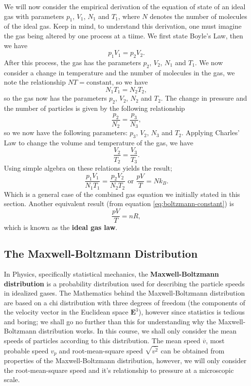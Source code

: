 We will now consider the empirical derivation of the equation of state of an ideal gas with parameters $p_1$, $V_1$, $N_1$ and $T_1$, where $N$ denotes the number of molecules of the ideal gas. Keep in mind, to understand this derivation, one must imagine the gas being altered by one process at a tiime. We first state Boyle's Law, then we have 
\begin{equation*}
    p_1 V_1 = p_2 V_2.    
\end{equation*}
After this process, the gas has the parameters $p_2$, $V_2$, $N_1$ and $T_1$. We now consider a change in temperature and the number of molecules in the gas, we note the relationship $NT = \text{constant}$, so we have 
\begin{equation*}
    N_1 T_1 = N_2 T_2,
\end{equation*} 
so the gas now has the parameters $p_2$, $V_2$, $N_2$ and $T_2$. The change in pressure and the number of particles is given by the following relationship 
\begin{equation*}
    \frac{p_2}{N_2} = \frac{p_3}{N_3},
\end{equation*} 
so we now have the following parameters: $p_3$, $V_2$, $N_3$ and $T_2$. Applying Charles' Law to change the volume and temperature of the gas, we have
\begin{equation*}
    \frac{V_2}{T_2} = \frac{V_3}{T_3}.
\end{equation*}
Using simple algebra on these relations yields the result;
\begin{equation*}
    \frac{p_1 V_1}{N_1 T_1} = \frac{p_2 V_2}{N_2 T_2} \text{ or } \frac{pV}{T} = N k_B.
\end{equation*}
Which is a general case of the combined gas equation we initially stated in this section. Another equivalent result (from equation \ref{eq:boltzmann-constant}) is 
\begin{equation*}
    \frac{pV}{T} = nR,
\end{equation*}
which is known as the \textbf{ideal gas law}.

\subsection{The Maxwell-Boltzmann Distribution}

In Physics, specifically statistical mechanics, the \textbf{Maxwell-Boltzmann distribution} is a probability distribution used for describing the particle speeds in idealized gases. The Mathematics behind the Maxwell-Boltzmann distribution are based on a chi distribution with three degrees of freedom (the components of the velocity vector in the Euclidean space $\mathbf{E}^3$), however since statistics is tedious and boring; we shall go no further than this for understanding why the Maxwell-Boltzmann distribution works. In this course, we shall only consider the mean speeds of particles according to this distribution. The mean speed $\overline{v}$, most probable speed $v_p$ and root-mean-square speed $\sqrt{\overline{v^2}}$ can be obtained from properties of the Maxwell-Boltzmann distribution, however, we will only consider the root-mean-square speed and it's relationship to pressure at a microscopic scale. 

